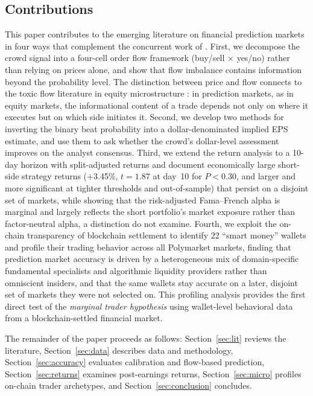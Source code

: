 \documentclass[11pt]{article}
\begin{document}
\subsection*{Contributions}

This paper contributes to the emerging literature on financial prediction markets in four ways that complement the concurrent work of \citet{gomezcram2025financial}. First, we decompose the crowd signal into a four-cell order flow framework (buy/sell $\times$ yes/no) rather than relying on prices alone, and show that flow imbalance contains information beyond the probability level. The distinction between price and flow connects to the toxic flow literature in equity microstructure \citep{easley1987price, kyle1985continuous}: in prediction markets, as in equity markets, the informational content of a trade depends not only on where it executes but on which side initiates it. Second, we develop two methods for inverting the binary beat probability into a dollar-denominated implied EPS estimate, and use them to ask whether the crowd's dollar-level assessment improves on the analyst consensus. Third, we extend the return analysis to a 10-day horizon with split-adjusted returns and document economically large short-side strategy returns ($+$3.45\%, $t = 1.87$ at day~10 for $P < 0.30$, and larger and more significant at tighter thresholds and out-of-sample) that persist on a disjoint set of markets, while showing that the risk-adjusted Fama--French alpha is marginal and largely reflects the short portfolio's market exposure rather than factor-neutral alpha, a distinction \citet{gomezcram2025financial} do not examine. Fourth, we exploit the on-chain transparency of blockchain settlement to identify 22 ``smart money'' wallets and profile their trading behavior across all Polymarket markets, finding that prediction market accuracy is driven by a heterogeneous mix of domain-specific fundamental specialists and algorithmic liquidity providers rather than omniscient insiders, and that the same wallets stay accurate on a later, disjoint set of markets they were not selected on. This profiling analysis provides the first direct test of the \textit{marginal trader hypothesis} \citep{forsythe1992anatomy} using wallet-level behavioral data from a blockchain-settled financial market.

The remainder of the paper proceeds as follows: Section~\ref{sec:lit} reviews the literature, Section~\ref{sec:data} describes data and methodology, Section~\ref{sec:accuracy} evaluates calibration and flow-based prediction, Section~\ref{sec:returns} examines post-earnings returns, Section~\ref{sec:micro} profiles on-chain trader archetypes, and Section~\ref{sec:conclusion} concludes.
\end{document}
